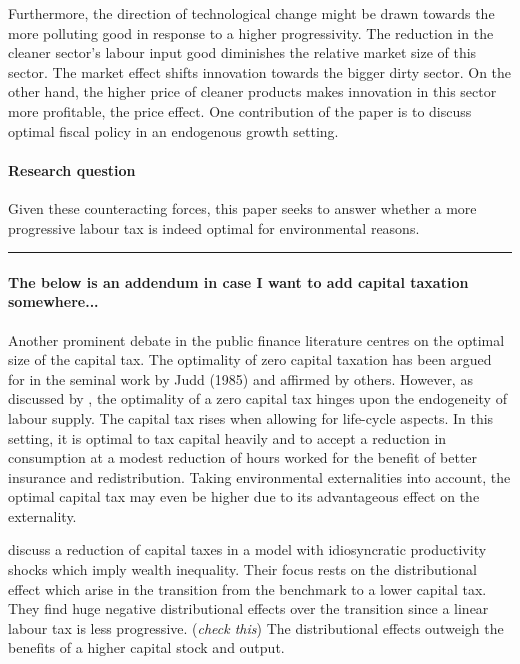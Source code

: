 Furthermore, the direction of technological change might be drawn towards the more polluting good in response to a higher progressivity. The reduction in the cleaner sector's labour input good diminishes the relative market size of this sector. The market effect shifts innovation towards the bigger dirty sector. On the other hand, the higher price of cleaner products makes innovation in this sector more profitable, the price effect. 
One contribution of the paper is to discuss optimal fiscal policy in an endogenous growth setting. 


\paragraph{Research question}
Given these counteracting forces, this paper seeks to answer whether a more progressive labour tax is indeed optimal for environmental reasons. 
\\

\noindent\rule[1ex]{\textwidth}{1pt}
\paragraph{The below is an addendum in case I want to add capital taxation somewhere...}  
Another prominent debate in the public finance literature centres on the optimal size of the capital tax. The optimality of zero capital taxation has been argued for in the seminal work by Judd (1985) and affirmed by others.  However, as discussed by \cite{Conesa2009TaxingAll}, the optimality of a zero capital tax hinges upon the endogeneity of labour supply. The capital tax rises when allowing for life-cycle aspects. In this setting, it is optimal to tax capital heavily and to accept a reduction in consumption at a modest reduction of hours worked for the benefit of better insurance and redistribution. Taking environmental externalities into account, the optimal capital tax may even be higher due to its advantageous effect on the externality.

\cite{Domeij2004OnTaxes} discuss a reduction of capital taxes in a model with idiosyncratic productivity shocks which imply  wealth inequality. Their focus rests on the distributional effect which arise in the transition from the benchmark to a lower capital tax. They find huge negative distributional effects over the transition since a linear labour tax is less progressive.  (\textit{check this}) The distributional effects outweigh the benefits of a higher capital stock and output. 

